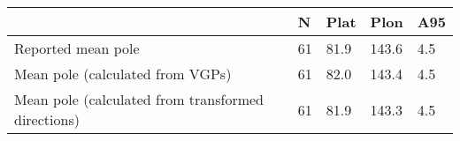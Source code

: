 \begin{tabular}{lllll}
\toprule
{} &   N &  Plat &   Plon &  A95 \\
\midrule
Reported mean pole                                 &  61 &  81.9 &  143.6 &  4.5 \\
Mean pole (calculated from VGPs)                   &  61 &  82.0 &  143.4 &  4.5 \\
Mean pole (calculated from transformed directions) &  61 &  81.9 &  143.3 &  4.5 \\
\bottomrule
\end{tabular}
